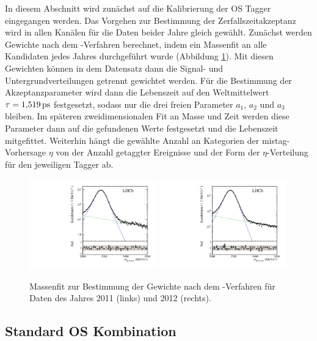 In diesem Abschnitt wird zunächst auf die Kalibrierung der OS Tagger eingegangen werden. Das Vorgehen zur Bestimmung der Zerfallszeitakzeptanz wird in allen Kanälen für die Daten beider Jahre gleich gewählt. Zunächst werden Gewichte nach dem \sPlot-Verfahren \cite{splot} berechnet, indem ein Massenfit an alle Kandidaten jedes Jahres durchgeführt wurde (Abbildung \ref{fig:fit_sweight}). Mit diesen Gewichten können in dem Datensatz dann die Signal- und Untergrundverteilungen getrennt gewichtet werden. Für die Bestimmung der Akzeptanzparameter wird dann die Lebenszeit auf den Weltmittelwert $\tau=\SI{1{,}519}{ps}$ \cite{PDG-2012} festgesetzt, sodass nur die drei freien Parameter $a_1$, $a_2$ und $a_3$ bleiben. Im späteren zweidimensionalen Fit an Masse und Zeit werden diese Parameter dann auf die gefundenen Werte festgesetzt und die Lebenszeit mitgefittet. Weiterhin hängt die gewählte Anzahl an Kategorien der mistag-Vorhersage $\eta$ von der Anzahl getaggter Ereignisse und der Form der $\eta$-Verteilung für den jeweiligen Tagger ab.
\begin{figure}[htbp]
	\centering
		\includegraphics[width=0.49\textwidth]{fig/sweight_2011.pdf}
		\includegraphics[width=0.49\textwidth]{fig/sweight_2012.pdf}
	\caption{Massenfit zur Bestimmung der Gewichte nach dem \sPlot-Verfahren für Daten des Jahres \num{2011} (links) und \num{2012} (rechts).}
	\label{fig:fit_sweight} 
\end{figure} 

\subsection{Standard OS Kombination}\label{sec:OSkalib}

